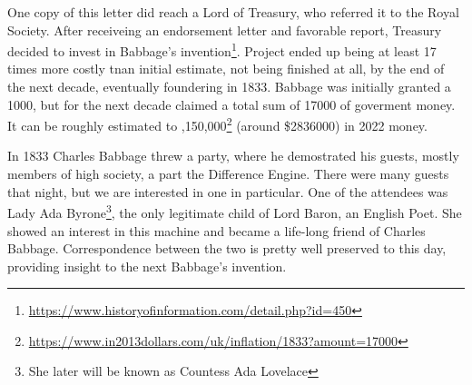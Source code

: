 \documentclass{article}
\begin{document}
            One copy of this letter did reach a Lord of Treasury, who referred it to the Royal Society. After receiveing an endorsement letter and favorable report, Treasury
            decided to invest in Babbage's invention\footnote{\href{https://www.historyofinformation.com/detail.php?id=450}{https://www.historyofinformation.com/detail.php?id=450}}.
            Project ended up being at least 17 times more costly tnan initial estimate, not being finished at all, by the end of the next decade, eventually foundering in 1833. Babbage
            was initially granted a \textsterling\num{1000}, but for the next decade claimed a total sum of \textsterling\num{17000} of goverment money. It can be roughly estimated to
            ,150,000\footnote{\href{https://www.in2013dollars.com/uk/inflation/1833?amount=17000}{https://www.in2013dollars.com/uk/inflation/1833?amount=17000}}
            (around \$\num{2836000}) in 2022 money. \par

            In 1833 Charles Babbage threw a party, where he demostrated his guests, mostly members of high society, a part the Difference Engine. There were many
            guests that night, but we are interested in one in particular. One of the attendees was Lady Ada Byrone\footnote{She later will be known as Countess Ada Lovelace},
            the only legitimate child of Lord Baron, an English Poet. She showed an interest in this machine and became a life-long friend of Charles Babbage.
            Correspondence between the two is pretty well preserved to this day, providing insight to the next Babbage's invention. \par
\end{document}
